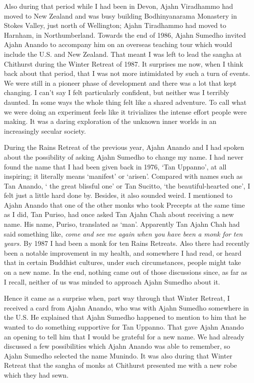 Also during that period while I had been in Devon, Ajahn Viradhammo had
moved to New Zealand and was busy building Bodhinyanarama Monastery in
Stokes Valley, just north of Wellington; Ajahn Tiradhammo had moved to
Harnham, in Northumberland. Towards the end of 1986, Ajahn Sumedho
invited Ajahn Anando to accompany him on an overseas teaching tour which
would include the U.S. and New Zealand. That meant I was left to lead
the sangha at Chithurst during the Winter Retreat of 1987. It surprises
me now, when I think back about that period, that I was not more
intimidated by such a turn of events. We were still in a pioneer phase
of development and there was a lot that kept changing. I can't say I
felt particularly confident, but neither was I terribly daunted. In some
ways the whole thing felt like a shared adventure. To call what we were
doing an experiment feels like it trivializes the intense effort people
were making. It was a daring exploration of the unknown inner worlds in
an increasingly secular society.

During the Rains Retreat of the previous year, Ajahn Anando and I had
spoken about the possibility of asking Ajahn Sumedho to change my name.
I had never found the name that I had been given back in 1976, `Tan
Uppanno', at all inspiring; it literally means `manifest' or `arisen'.
Compared with names such as Tan Anando, ` the great blissful one' or Tan
Sucitto, `the beautiful-hearted one', I felt just a little hard done by.
Besides, it also sounded weird. I mentioned to Ajahn Anando that one of
the other monks who took Precepts at the same time as I did, Tan Puriso,
had once asked Tan Ajahn Chah about receiving a new name. His name,
Puriso, translated as `man'. Apparently Tan Ajahn Chah had said
something like, \emph{come and see me again when you have been a monk
for ten years.} By 1987 I had been a monk for ten Rains Retreats. Also
there had recently been a notable improvement in my health, and
somewhere I had read, or heard that in certain Buddhist cultures, under
such circumstances, people might take on a new name. In the end, nothing
came out of those discussions since, as far as I recall, neither of us
was minded to approach Ajahn Sumedho about it.

Hence it came as a surprise when, part way through that Winter Retreat,
I received a card from Ajahn Anando, who was with Ajahn Sumedho
somewhere in the U.S. He explained that Ajahn Sumedho happened to
mention to him that he wanted to do something supportive for Tan
Uppanno. That gave Ajahn Anando an opening to tell him that I would be
grateful for a new name. We had already discussed a few possibilities
which Ajahn Anando was able to remember, so Ajahn Sumedho selected the
name Munindo. It was also during that Winter Retreat that the sangha of
monks at Chithurst presented me with a new robe which they had sewn.

